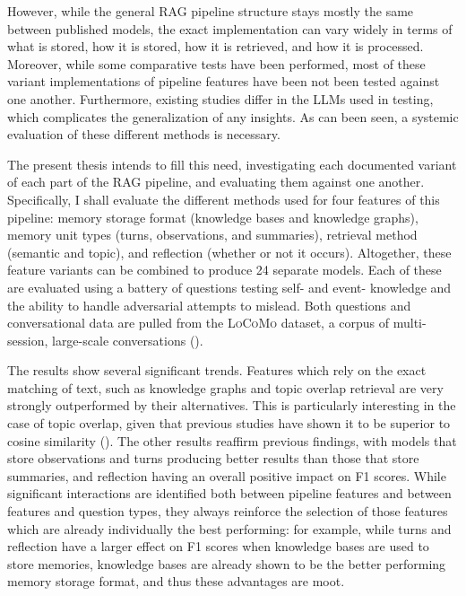 	However, while the general RAG pipeline structure stays mostly the same between published models, the exact implementation can vary widely in terms of what is stored, how it is stored, how it is retrieved, and how it is processed. Moreover, while some comparative tests have been performed, most of these variant implementations of pipeline features have been not been tested against one another. Furthermore, existing studies differ in the LLMs used in testing, which complicates the generalization of any insights. As can been seen, a systemic evaluation of these different methods is necessary.
	
	The present thesis intends to fill this need, investigating each documented variant of each part of the RAG pipeline, and evaluating them against one another. Specifically, I shall evaluate the different methods used for four features of this pipeline: memory storage format (knowledge bases and knowledge graphs), memory unit types (turns, observations, and summaries), retrieval method (semantic and topic), and reflection (whether or not it occurs). Altogether, these feature variants can be combined to produce 24 separate models. Each of these are evaluated using a battery of questions testing self- and event- knowledge and the ability to handle adversarial attempts to mislead. Both questions and conversational data are pulled from the \textsc{LoCoMo} dataset, a corpus of multi-session, large-scale conversations (\cite{Maharana2024}).
	
The results show several significant trends. Features which rely on the exact matching of text, such as knowledge graphs and topic overlap retrieval are very strongly outperformed by their alternatives. This is particularly interesting in the case of topic overlap, given that previous studies have shown it to be superior to cosine similarity (\cite{Li2024}). The other results reaffirm previous findings, with models that store observations and turns producing better results than those that store summaries, and reflection having an overall positive impact on F1 scores. While significant interactions are identified both between pipeline features and between features and question types, they always reinforce the selection of those features which are already individually the best performing: for example, while turns and reflection have a larger effect on F1 scores when knowledge bases are used to store memories, knowledge bases are already shown to be the better performing memory storage format, and thus these advantages are moot.
	
